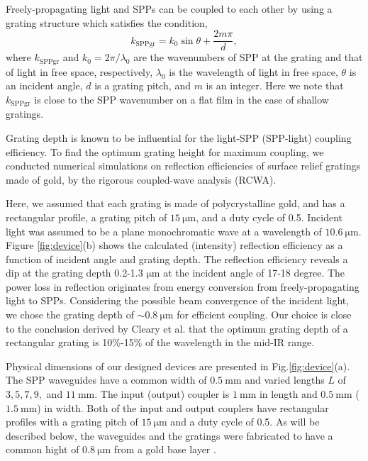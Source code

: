 \documentclass[aip,apl,reprint]{revtex4-1}
\begin{document}
Freely-propagating light and SPPs can be coupled to each other by using a grating structure which satisfies the condition\cite{Koev},
\begin{equation}
k_{\mathrm{SPPgr}}=k_0 \sin \theta + \frac{2m\pi}{d},
\label{eq:phase-match}
\end{equation}
where $k_{\mathrm{SPPgr}}$ and $k_0=2\pi/\lambda_0$ are the wavenumbers of SPP at the grating and that of light in free space, respectively, $\lambda_0$ is the wavelength of light in free space, $\theta$ is an incident angle, $d$ is a grating pitch, and $m$ is an integer. Here we note that $k_{\mathrm{SPPgr}}$ is close to the SPP wavenumber on a flat film in the case of shallow gratings.

Grating depth is known to be influential for the light-SPP (SPP-light) coupling efficiency\cite{Koev, Cleary2010}. To find the optimum grating height for maximum coupling, we conducted numerical simulations on reflection efficiencies of surface relief gratings made of gold, by the rigorous coupled-wave analysis (RCWA)\cite{Leveque}. 

Here, we assumed that each grating is made of polycrystalline gold, and has a rectangular profile, a grating pitch of $15\:\mathrm{\mu m}$, and a duty cycle of 0.5. Incident light was assumed to be a plane monochromatic wave at a wavelength of $10.6\:\mathrm{\mu m}$. 
Figure \ref{fig:device}(b) shows the calculated (intensity) reflection efficiency as a function of incident angle and grating depth. The reflection efficiency reveals a dip at the grating depth 0.2-1.3 $\mathrm{\mu m}$ at the incident angle of 17-18 degree.
The power loss in reflection originates from energy conversion from freely-propagating light to SPPs.
Considering the possible beam convergence of the incident light, we chose the grating depth of $\sim0.8\:\mathrm{\mu m}$ for efficient coupling. Our choice is close to the conclusion derived by Cleary et al.\cite{Cleary2010} that the optimum grating depth of a rectangular grating is 10\%-15\% of the wavelength in the mid-IR range.

Physical dimensions of our designed devices are presented in Fig.\ref{fig:device}(a).  The SPP waveguides have a common width of $0.5\:\mathrm{mm}$ and varied lengths $L$ of $3, 5, 7, 9,$ and $11\:\mathrm{mm}$. The input (output) coupler is $1\:\mathrm{mm}$ in length and $0.5\:\mathrm{mm}$ ($1.5\:\mathrm{mm}$) in width. Both of the input and output couplers have rectangular profiles with a grating pitch of $15\:\mathrm{\mu m}$ and a duty cycle of 0.5. As will be described below, the waveguides and the gratings were fabricated to have a common hight of $0.8\:\mathrm{\mu m}$ from a gold base layer .
\end{document}

